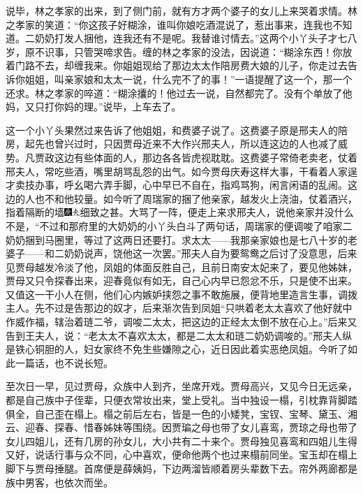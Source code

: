说毕，林之孝家的出来，到了侧门前，就有方才两个婆子的女儿上来哭着求情。林之孝家的笑道：``你这孩子好糊涂，谁叫你娘吃酒混说了，惹出事来，连我也不知道。二奶奶打发人捆他，连我还有不是呢。我替谁讨情去。''这两个小丫头子才七八岁，原不识事，只管哭啼求告。缠的林之孝家的没法，因说道：``糊涂东西！你放着门路不去，却缠我来。你姐姐现给了那边太太作陪房费大娘的儿子，你走过去告诉你姐姐，叫亲家娘和太太一说，什么完不了的事！''一语提醒了这一个，那一个还求。林之孝家的啐道：``糊涂攮的！他过去一说，自然都完了。没有个单放了他妈，又只打你妈的理。''说毕，上车去了。

这一个小丫头果然过来告诉了他姐姐，和费婆子说了。这费婆子原是邢夫人的陪房，起先也曾兴过时，只因贾母近来不大作兴邢夫人，所以连这边的人也减了威势。凡贾政这边有些体面的人，那边各各皆虎视耽耽。这费婆子常倚老卖老，仗着邢夫人，常吃些酒，嘴里胡骂乱怨的出气。如今贾母庆寿这样大事，干看着人家逞才卖技办事，呼幺喝六弄手脚，心中早已不自在，指鸡骂狗，闲言闲语的乱闹。这边的人也不和他较量。如今听了周瑞家的捆了他亲家，越发火上浇油，仗着酒兴，指着隔断的墙{\includegraphics[width=3mm]{../Images/00004}\includegraphics[width=3mm]{../Images/00012}\footnotesize \kaishu 细致之甚。}大骂了一阵，便走上来求邢夫人，说他亲家并没什么不是，``不过和那府里的大奶奶的小丫头白斗了两句话，周瑞家的便调唆了咱家二奶奶捆到马圈里，等过了这两日还要打。求太太------我那亲家娘也是七八十岁的老婆子------和二奶奶说声，饶他这一次罢。''邢夫人自为要鸳鸯之后讨了没意思，后来见贾母越发冷淡了他，凤姐的体面反胜自己，且前日南安太妃来了，要见他姊妹，贾母又只令探春出来，迎春竟似有如无，自己心内早已怨忿不乐，只是使不出来。又值这一干小人在侧，他们心内嫉妒挟怨之事不敢施展，便背地里造言生事，调拨主人。先不过是告那边的奴才，后来渐次告到凤姐``只哄着老太太喜欢了他好就中作威作福，辖治着琏二爷，调唆二太太，把这边的正经太太倒不放在心上。''后来又告到王夫人，说：``老太太不喜欢太太，都是二太太和琏二奶奶调唆的。''邢夫人纵是铁心铜胆的人，妇女家终不免生些嫌隙之心，近日因此着实恶绝凤姐。今听了如此一篇话，也不说长短。

至次日一早，见过贾母，众族中人到齐，坐席开戏。贾母高兴，又见今日无远亲，都是自己族中子侄辈，只便衣常妆出来，堂上受礼。当中独设一榻，引枕靠背脚踏俱全，自己歪在榻上。榻之前后左右，皆是一色的小矮凳，宝钗、宝琴、黛玉、湘云、迎春、探春、惜春姊妹等围绕。因贾㻞之母也带了女儿喜鸾，贾琼之母也带了女儿四姐儿，还有几房的孙女儿，大小共有二十来个。贾母独见喜鸾和四姐儿生得又好，说话行事与众不同，心中喜欢，便命他两个也过来榻前同坐。宝玉却在榻上脚下与贾母捶腿。首席便是薛姨妈，下边两溜皆顺着房头辈数下去。帘外两廊都是族中男客，也依次而坐。

